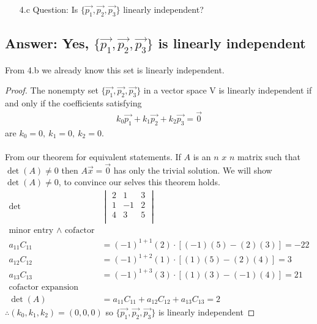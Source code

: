 \documentclass[11pt]{article}
\begin{document}
\pagebreak
\begin{enumerate}
        \item[4.c]Question: Is $\{\vec{p_1},\vec{p_2},\vec{p_3}\}$ linearly independent?
\end{enumerate}
\subsection{Answer: Yes, $\{\vec{p_1},\vec{p_2},\vec{p_3}\}$ is linearly independent}
From 4.b we already know this set is linearly independent.
\begin{proof}
        The nonempty set $\{\vec{p_{1}},\vec{p_{2}},\vec{p_{3}}\}$
        in a vector space V is linearly independent if and only if the
        coefficients satisfying
        \begin{align*}
                k_{0}\vec{p_{1}} + k_{1}\vec{p_{2}} + k_{2}\vec{p_{3}} = \vec{0}
        \end{align*}
        are $k_{0} = 0,\ k_{1} = 0,\ k_{2} = 0$. \\\\
        From our theorem for equivalent statements.
        If $A$ is an $n$ $x$ $n$ matrix such that $\det(A)\neq0$
        then $A\vec{x}=\vec{0}$ has only the trivial solution.
        We will show $\det(A)\neq0$, to convince our selves this theorem holds.
        \begin{align*}
                \det
                             &
                \begin{vmatrix}
                        2 & 1  & 3 \\
                        1 & -1 & 2 \\
                        4 & 3  & 5 \\
                \end{vmatrix}
                \\
                \textrm{minor entry $\land$ cofactor}                           \\
                a_{11}C_{11} & = (-1)^{1+1}(2)\cdot[(-1)(5)-(2)(3)] = -22       \\
                a_{12}C_{12} & = (-1)^{1+2}(1)\cdot[(1)(5)-(2)(4)]  = 3         \\
                a_{13}C_{13} & = (-1)^{1+3}(3)\cdot[(1)(3)-(-1)(4)] = 21        \\
                \textrm{cofactor expansion }                                    \\
                \det(A)      & = a_{11}C_{11} + a_{12}C_{12} + a_{13}C_{13} = 2
        \end{align*}
        $\therefore (k_{0}, k_{1}, k_{2}) = (0,0,0)$ so $\{\vec{p_{1}}, \vec{p_{2}}, \vec{p_{3}}\}$ is linearly independent
\end{proof}
\pagebreak
\end{document}
